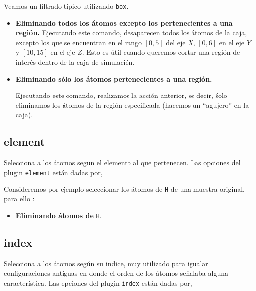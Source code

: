 Veamos un filtrado t\'ipico utilizando \verb|box|.

\begin{itemize}
 \item \textbf{Eliminando todos los \'atomos excepto los pertenecientes a una
regi\'on.}
Ejecutando este comando, desaparecen todos los \'atomos de la caja, excepto los
que se encuentran en el rango $[0,5]$ del eje $X$, $[0,6]$ en el eje $Y$ y
$[10,15]$ en el eje $Z$. Esto es \'util cuando queremos cortar una regi\'on de
inter\'es dentro de la caja de simulaci\'on.

 
 \item \textbf{Eliminando s\'olo los \'atomos pertenecientes a una regi\'on.}

Ejecutando este comando, realizamos la acci\'on anterior, es decir, \'solo
eliminamos los \'atomos de la regi\'on especificada (hacemos un ``agujero'' en
la caja).
\end{itemize}

\subsection{element}
Selecciona a los \'atomos segun el elemento al que pertenecen. Las opciones del
plugin \verb|element| est\'an dadas por,


Consideremos por ejemplo seleccionar los \'atomos de \verb|H| de una muestra
original, para ello :

\begin{itemize}
 \item \textbf{Eliminando \'atomos de} \texttt{H}.
\end{itemize}


\subsection{index}
Selecciona a los \'atomos seg\'un su indice, muy utilizado para igualar
configuraciones antiguas en donde el orden de los \'atomos se\~nalaba alguna
caracter\'istica. Las opciones del plugin \verb|index| est\'an dadas por,

